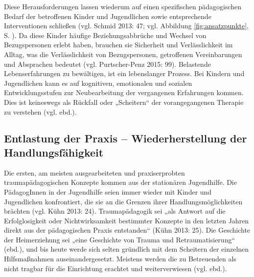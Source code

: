 Diese Herausforderungen lassen wiederum auf einen spezifischen pädagogischen Bedarf der betroffenen Kinder und Jugendlichen sowie entsprechende Interventionen schließen (vgl. Schmid 2013: 47; vgl. Abbildung \ref{fig:ansatzpunkte}, S. \pageref{fig:ansatzpunkte}). Da diese Kinder häufige Beziehungsabbrüche und Wechsel von Bezugspersonen erlebt haben, brauchen sie Sicherheit und Verlässlichkeit im Alltag, was die Verlässlichkeit von Bezugspersonen, getroffenen Vereinbarungen und Absprachen bedeutet (vgl. Purtscher-Penz 2015: 99). Belastende Lebenserfahrungen zu bewältigen, ist ein lebenslanger Prozess. Bei Kindern und Jugendlichen kann es auf kognitiven, emotionalen und sozialen Entwicklungsstufen zur Neubearbeitung der vergangenen Erfahrungen kommen. Dies ist keineswegs als Rückfall oder „Scheitern“ der vorangegangenen Therapie zu verstehen (vgl. ebd.).

\subsection{Entlastung der Praxis – Wiederherstellung der Handlungsfähigkeit}
Die ersten, am meisten ausgearbeiteten und praxiserprobten traumapädagogischen Konzepte kommen aus der stationären Jugendhilfe. Die PädagogInnen in der Jugendhilfe seien immer wieder mit Kinder und Jugendlichen konfrontiert, die sie an die Grenzen ihrer Handlungsmöglichkeiten brächten (vgl. Kühn 2013: 24). Traumap{\"a}dagogik sei „als Antwort auf die Erfolglosigkeit oder Nichtwirksamkeit bestimmter Konzepte in den letzten Jahren direkt aus der pädagogischen Praxis entstanden“ (Kühn 2013: 25). Die Geschichte der Heimerziehung sei „eine Geschichte von Trauma und Retraumatisierung\footnotemark“ (ebd.), und bis heute werde sich selten gründlich mit dem Scheitern der einzelnen Hilfsmaßnahmen auseinandergesetzt. Meistens werden die zu Betreuenden als nicht tragbar für die Einrichtung erachtet und weiterverwiesen (vgl. ebd.).


